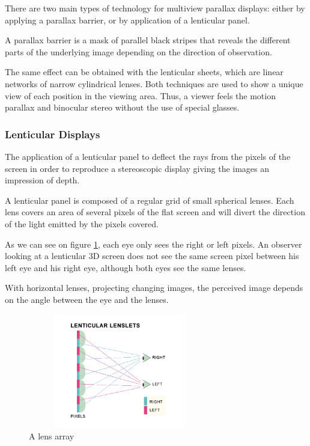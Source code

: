 There are two main types of technology for multiview parallax displays: either by applying a parallax barrier, or by application of a lenticular panel.

A parallax barrier is a mask of parallel black stripes that reveals the different parts of the underlying image depending on the direction of observation.

The same effect can be obtained with the lenticular sheets, which are linear networks of narrow cylindrical lenses. Both techniques are used to show a unique view of each position in the viewing area. Thus, a viewer feels the motion parallax and binocular stereo without the use of special glasses. 

\subsubsection{Lenticular Displays}
The application of a lenticular panel to deflect the rays from the pixels of the screen in order to reproduce a stereoscopic display giving the images an impression of depth.

A lenticular panel is composed of a regular grid of small spherical lenses. Each lens covers an area of several pixels of the flat screen and will divert the direction of the light emitted by the pixels covered.

As we can see on figure \ref{fig:lenticular}, each eye only sees the right or left pixels. An observer looking at a lenticular 3D screen does not see the same screen pixel between his left eye and his right eye, although both eyes see the same lenses.

With horizontal lenses, projecting changing images, the perceived image depends on the angle between the eye and the lenses.

\begin{figure}[h!]
\centering
\includegraphics[width=8cm,height=5cm]{image/lentuc.png}
\caption{A lens array}

\label{fig:lenticular}
\end{figure}

